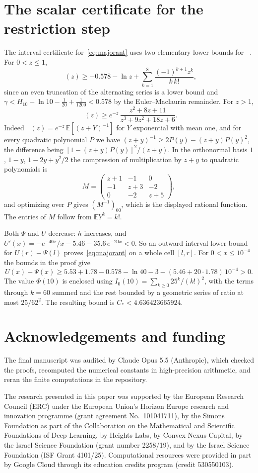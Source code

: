 \documentclass[11pt]{amsart}
\theoremstyle{definition}
\theoremstyle{remark}
\newcommand{\E}{\mathbb E}
\DeclareMathOperator{\Ei}{E_1}
\begin{document}
\appendix
\section{The scalar certificate for the restriction step}\label{app:cert}

The interval certificate for~\eqref{eq:majorant} uses two elementary lower bounds for $\Ei$. For $0<z\le1$,
\[
 \Ei(z)\ge-0.578-\ln z+\sum_{k=1}^{8}\frac{(-1)^{k+1}z^k}{k\,k!},
\]
since an even truncation of the alternating series is a lower bound and $\gamma<H_{10}-\ln10-\frac1{20}+\frac1{1200}<0.578$ by the Euler--Maclaurin remainder. For $z>1$,
\[
 \Ei(z)\ge e^{-z}\,\frac{z^2+8z+11}{z^3+9z^2+18z+6}.
\]
Indeed $\Ei(z)=e^{-z}\,\E[(z+Y)^{-1}]$ for $Y$ exponential with mean one, and for every quadratic polynomial $P$ we have $(z+y)^{-1}\ge2P(y)-(z+y)P(y)^2$, the difference being $[1-(z+y)P(y)]^2/(z+y)$. In the orthonormal basis $1$, $1-y$, $1-2y+y^2/2$ the compression of multiplication by $z+y$ to quadratic polynomials is
\[
 M=\begin{pmatrix}z+1&-1&0\\-1&z+3&-2\\0&-2&z+5\end{pmatrix},
\]
and optimizing over $P$ gives $(M^{-1})_{00}$, which is the displayed rational function. The entries of $M$ follow from $\E Y^k=k!$.

Both $\Psi$ and $U$ decrease: $h$ increases, and $U'(x)=-e^{-40x}/x-5.46-35.6\,e^{-20x}<0$. So an outward interval lower bound for $U(r)-\Psi(l)$ proves~\eqref{eq:majorant} on a whole cell $[l,r]$. For $0<x\le10^{-4}$ the bounds in the proof give
\[
 U(x)-\Psi(x)\ge5.53+1.78-0.578-\ln40-3-(5.46+20\cdot1.78)\,10^{-4}>0.
\]
The value $\Phi(10)$ is enclosed using $I_0(10)=\sum_{k\ge0}25^k/(k!)^2$, with the terms through $k=60$ summed and the rest bounded by a geometric series of ratio at most $25/62^2$. The resulting bound is $C_*<4.636423665924$.

\section*{Acknowledgements and funding}
The final manuscript was audited by Claude Opus 5.5 (Anthropic), which checked the proofs, recomputed the numerical constants in high-precision arithmetic, and reran the finite computations in the repository.

The research presented in this paper was supported by the European Research
Council (ERC) under the European Union's Horizon Europe research and
innovation programme (grant agreement No.~101041711), by the Simons
Foundation as part of the Collaboration on the Mathematical and Scientific
Foundations of Deep Learning, by Heights Labs, by Convex Nexus Capital, by
the Israel Science Foundation (grant number 2258/19), and by the Israel
Science Foundation (ISF Grant 4101/25). Computational resources were
provided in part by Google Cloud through its education credits program
(credit 530550103).
\end{document}
